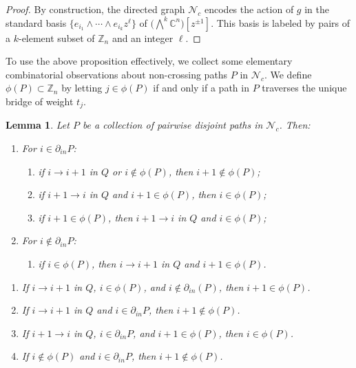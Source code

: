 \documentclass[12pt]{amsart}
\newcommand{\CC}{\mathbb{C}}
\newcommand{\ZZ}{\mathbb{Z}}
\newcommand{\cN}{\mathcal{N}} %
\newtheorem{lemma}[theorem]{Lemma}
\theoremstyle{remark}
\numberwithin{equation}{section}
\begin{document}
\begin{proof}
By construction, the directed graph $\cN_c$ encodes the action of $g$ in the standard basis $\{ e_{i_1} \wedge \cdots \wedge e_{i_k} z^\ell\}$ of $\big(\!\bigwedge^{\!k}\CC^n\big)[z^{\pm 1}]$. 
This basis is labeled by pairs of a $k$-element subset of $\ZZ_n$ and an integer $\ell$.
\end{proof}

To use the above proposition effectively, we collect some elementary combinatorial observations about non-crossing paths $P$ in $\cN_c$. 
We define $\phi(P) \subset \ZZ_n$ by letting $j \in \phi(P)$ if and only if a path in $P$ traverses the unique bridge of weight $t_j$.

\begin{lemma}\label{lem:phi}
  Let $P$ be a collection of pairwise disjoint paths in $\cN_c$.  Then:
  \begin{enumerate}
    \item For $i\in\partial_{in}P$:
    \begin{enumerate}
      \item if $i\to i+1$ in $Q$ or $i\notin\phi(P)$, then $i+1\notin\phi(P)$;
      \item if $i+1\to i$ in $Q$ and $i+1\in\phi(P)$, then $i\in\phi(P)$;
      \item[(b')] if  $i+1\in\phi(P)$, then $i+1\to i$ in $Q$ and $i\in\phi(P)$;
    \end{enumerate}
    \item For $i\notin\partial_{in}P$: 
    \begin{enumerate}
      \item if $i\in\phi(P)$, then $i\to i+1$ in $Q$ and $i+1\in\phi(P)$.\\
    \end{enumerate}
  \end{enumerate}
  \begin{enumerate}
    \item If $i \to i+1$ in $Q$, $i \in \phi(P)$, and $i \notin \partial_{in}(P)$, then $i + 1 \in \phi(P)$.
    \item If $i \to i+1$ in $Q$ and $i \in \partial_{in}P$, then $i +1 \notin \phi(P)$.
    \item If $i+1 \to i$ in $Q$, $i \in \partial_{in}P$, and $i+1 \in \phi(P)$, then $i \in \phi(P)$.
    \item If $i \notin \phi(P)$ and $i \in \partial_{in}P$, then $i +1 \notin \phi(P)$.
  \end{enumerate}
\end{lemma}
\end{document}

